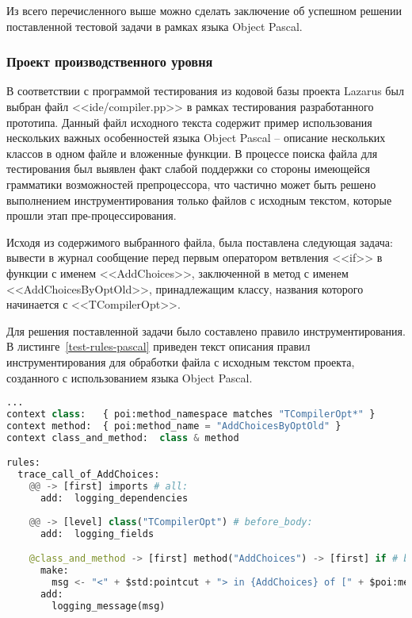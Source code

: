 Из всего перечисленного выше можно сделать заключение об успешном решении поставленной тестовой задачи в рамках языка Object Pascal.

\subsubsection{Проект производственного уровня}

В соответствии с программой тестирования из кодовой базы проекта Lazarus был выбран файл <<ide/compiler.pp>> в рамках тестирования разработанного прототипа.
Данный файл исходного текста содержит пример использования нескольких важных особенностей языка Object Pascal -- описание нескольких классов в одном файле и вложенные функции.
В процессе поиска файла для тестирования был выявлен факт слабой поддержки со стороны имеющейся грамматики возможностей препроцессора, что частично может быть решено выполнением инструментирования только файлов с исходным текстом, которые прошли этап пре-процессирования.

Исходя из содержимого выбранного файла, была поставлена следующая задача:
вывести в журнал сообщение перед первым оператором ветвления <<if>> в функции с именем <<AddChoices>>, заключенной в метод с именем <<AddChoicesByOptOld>>, принадлежащим классу, названия которого начинается с <<TCompilerOpt>>.

Для решения поставленной задачи было составлено правило инструментирования.
В листинге~\ref{test-rules-pascal} приведен текст описания правил инструментирования для обработки файла с исходным текстом проекта, созданного с использованием языка Object Pascal.

\begin{lstlisting}[frame=single, language=Python, label={test-rules-pascal}, caption={Описание правил инструментирования. Object Pascal-проект.}]
...
context class:   { poi:method_namespace matches "TCompilerOpt*" }
context method:  { poi:method_name = "AddChoicesByOptOld" }
context class_and_method:  class & method

rules:
  trace_call_of_AddChoices:
    @@ -> [first] imports # all:
      add:  logging_dependencies
  
    @@ -> [level] class("TCompilerOpt") # before_body:
      add:  logging_fields

    @class_and_method -> [first] method("AddChoices") -> [first] if # before:
      make:
        msg <- "<" + $std:pointcut + "> in {AddChoices} of [" + $poi:method_name_full + "] method";
      add:
        logging_message(msg)
\end{lstlisting}

